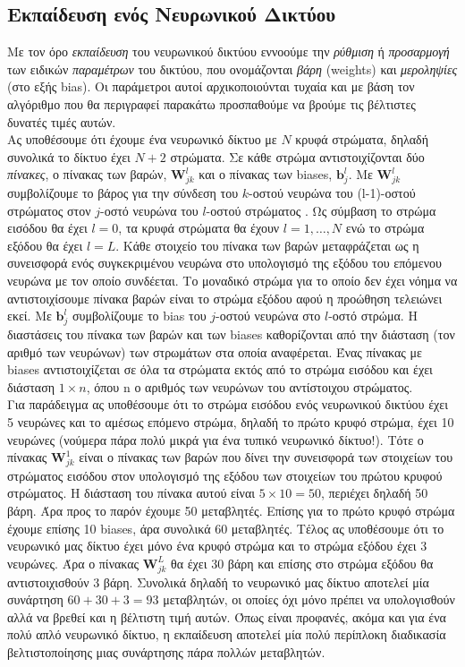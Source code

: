\documentclass[11pt]{article} %
\numberwithin{equation}{subsection}
\begin{document}
\subsection{Εκπαίδευση ενός Νευρωνικού Δικτύου}
Με τον όρο \textit{εκπαίδευση} του νευρωνικού δικτύου εννοούμε την \textit{ρύθμιση} ή \textit{προσαρμογή} των ειδικών \textit{παραμέτρων} του δικτύου, που ονομάζονται \textit{βάρη} (weights) και \textit{μεροληψίες} (στο εξής bias). Οι παράμετροι αυτοί αρχικοποιούνται τυχαία και με βάση τον αλγόριθμο που θα περιγραφεί παρακάτω προσπαθούμε να βρούμε τις βέλτιστες δυνατές τιμές αυτών.\\

Ας υποθέσουμε ότι έχουμε ένα νευρωνικό δίκτυο με $N$ κρυφά στρώματα, δηλαδή συνολικά το δίκτυο έχει $N+2$ στρώματα. Σε κάθε στρώμα αντιστοιχίζονται δύο \textit{πίνακες}, ο πίνακας των βαρών, $\textbf{W}_{jk} ^l$ και ο πίνακας των biases, $\textbf{b}^{l}_{j}$. Με $\textbf{W}_{jk} ^l$ συμβολίζουμε το βάρος για την σύνδεση του $k$-οστού νευρώνα του (l-1)-οστού στρώματος στον $j$-οστό νευρώνα του $l$-οστού στρώματος . Ως σύμβαση το στρώμα εισόδου θα έχει $l = 0$,  τα κρυφά στρώματα θα έχουν $l = 1, \dots , N$ ενώ το στρώμα εξόδου θα έχει $l=L$. Κάθε στοιχείο του πίνακα των βαρών μεταφράζεται ως η συνεισφορά ενός συγκεκριμένου νευρώνα στο υπολογισμό της εξόδου του επόμενου νευρώνα με τον οποίο συνδέεται. Το μοναδικό στρώμα για το οποίο δεν έχει νόημα να αντιστοιχίσουμε πίνακα βαρών είναι το στρώμα εξόδου αφού η προώθηση τελειώνει εκεί. Με $\textbf{b}^{l}_{j}$ συμβολίζουμε το bias του $j$-οστού νευρώνα στο $l$-οστό στρώμα. Η διαστάσεις του πίνακα των βαρών και των biases καθορίζονται από την διάσταση (τον αριθμό των νευρώνων) των στρωμάτων στα οποία αναφέρεται. Ένας πίνακας με biases αντιστοιχίζεται σε όλα τα στρώματα εκτός από το στρώμα εισόδου και έχει διάσταση $1 \times n$, όπου n ο αριθμός των νευρώνων του αντίστοιχου στρώματος. \\

Για παράδειγμα ας υποθέσουμε ότι το στρώμα εισόδου ενός νευρωνικού δικτύου έχει 5 νευρώνες και το αμέσως επόμενο στρώμα, δηλαδή το πρώτο κρυφό στρώμα, έχει 10 νευρώνες (νούμερα πάρα πολύ μικρά για ένα τυπικό νευρωνικό δίκτυο!). Τότε ο πίνακας  $\textbf{W}_{jk} ^1$ είναι ο πίνακας των βαρών που δίνει την συνεισφορά των στοιχείων του στρώματος εισόδου στον υπολογισμό της εξόδου των στοιχείων του πρώτου κρυφού στρώματος. Η διάσταση του πίνακα αυτού είναι $5 \times 10 = 50$, περιέχει δηλαδή 50 βάρη. Άρα προς το παρόν έχουμε 50 μεταβλητές. Επίσης για το πρώτο κρυφό στρώμα έχουμε επίσης 10 biases, άρα συνολικά 60 μεταβλητές. Τέλος ας υποθέσουμε ότι το νευρωνικό μας δίκτυο έχει μόνο ένα κρυφό στρώμα και το στρώμα εξόδου έχει 3 νευρώνες. Άρα ο πίνακας $\textbf{W}_{jk} ^{L}$ θα έχει 30 βάρη και επίσης στο στρώμα εξόδου θα αντιστοιχισθούν 3 βάρη. Συνολικά δηλαδή το νευρωνικό μας δίκτυο αποτελεί μία συνάρτηση $60 + 30 + 3 = 93$ μεταβλητών, οι οποίες όχι μόνο πρέπει να υπολογισθούν αλλά να βρεθεί και η βέλτιστη τιμή αυτών. Όπως είναι προφανές, ακόμα και για ένα πολύ απλό νευρωνικό δίκτυο, η εκπαίδευση αποτελεί μία πολύ περίπλοκη διαδικασία βελτιστοποίησης μιας συνάρτησης πάρα πολλών μεταβλητών. \\
\end{document}
